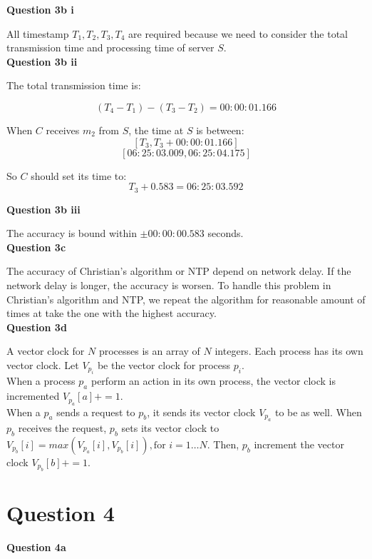 \documentclass[11pt,a4paper]{report}
\begin{document}
\begin{multicols*}{2}
\noindent \textbf{Question 3b i}

\noindent All timestamp $T_1,T_2,T_3,T_4$ are required because we need to consider the total transmission time and processing time of server $S$.\\

\noindent \textbf{Question 3b ii}

\noindent The total transmission time is:

$$(T_4 - T_1) - (T_3 - T_2) = 00:00:01.166$$

\noindent When $C$ receives $m_2$ from $S$, the time at $S$ is between:
$$[T_3, T_3 + 00:00:01.166]$$
$$[06:25:03.009, 06:25:04.175]$$

\noindent So $C$ should set its time to:
$$T_3 + 0.583 = 06:25:03.592$$

\noindent \textbf{Question 3b iii}

\noindent The accuracy is bound within $\pm 00:00:00.583$ seconds.\\

\noindent \textbf{Question 3c}

\noindent The accuracy of Christian's algorithm or NTP depend on network delay. If the network delay is longer, the accuracy is worsen. To handle this problem in Christian's algorithm and NTP, we repeat the algorithm for reasonable amount of times at take the one with the highest accuracy.\\

\noindent \textbf{Question 3d}

\noindent A vector clock for $N$ processes is an array of $N$ integers. Each process has its own vector clock. Let $V_{p_i}$ be the vector clock for process $p_i$.\\

\noindent When a process $p_a$ perform an action in its own process, the vector clock is incremented $V_{p_a}[a] += 1$.\\

\noindent When a $p_a$ sends a request to $p_b$, it sends its vector clock $V_{p_a}$ to be as well. When $p_b$ receives the request, $p_b$ sets its vector clock to $V_{p_b}[i] = max(V_{p_a}[i], V_{p_b}[i]), \text{for } i=1\ldots N$. Then, $p_b$ increment the vector clock $V_{p_b}[b] += 1$.

\section{Question 4}

\noindent \textbf{Question 4a}


\end{multicols*}
\end{document}
